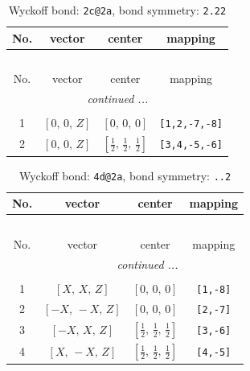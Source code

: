 \documentclass[fleqn,8pt]{jsarticle}
\begin{document}
\renewcommand{\arraystretch}{1.2}
\begin{longtable}{cccc}
\caption{Wyckoff bond: {\tt 2c@2a}, bond symmetry: {\tt 2.22}}
 \\
 \hline \hline
No. & vector & center & mapping \\ \hline \endfirsthead

\multicolumn{3}{l}{\tablename\ \thetable{}} \\
 \hline \hline
No. & vector & center & mapping \\ \hline \endhead

 \hline \hline
\multicolumn{3}{r}{\footnotesize\it continued ...} \\ \endfoot

 \hline \hline
\multicolumn{3}{r}{} \\ \endlastfoot

1 & $\left[ 0,\, 0,\, Z \right]$ & $\left[ 0,\, 0,\, 0 \right]$ & {\tt [1,2,-7,-8]} \\ \hline
2 & $\left[ 0,\, 0,\, Z \right]$ & $\left[ \frac{1}{2},\, \frac{1}{2},\, \frac{1}{2} \right]$ & {\tt [3,4,-5,-6]} \\
\end{longtable}
\renewcommand{\arraystretch}{1.2}
\begin{longtable}{cccc}
\caption{Wyckoff bond: {\tt 4d@2a}, bond symmetry: {\tt ..2}}
 \\
 \hline \hline
No. & vector & center & mapping \\ \hline \endfirsthead

\multicolumn{3}{l}{\tablename\ \thetable{}} \\
 \hline \hline
No. & vector & center & mapping \\ \hline \endhead

 \hline \hline
\multicolumn{3}{r}{\footnotesize\it continued ...} \\ \endfoot

 \hline \hline
\multicolumn{3}{r}{} \\ \endlastfoot

1 & $\left[ X,\, X,\, Z \right]$ & $\left[ 0,\, 0,\, 0 \right]$ & {\tt [1,-8]} \\ \hline
2 & $\left[ - X,\, - X,\, Z \right]$ & $\left[ 0,\, 0,\, 0 \right]$ & {\tt [2,-7]} \\ \hline
3 & $\left[ - X,\, X,\, Z \right]$ & $\left[ \frac{1}{2},\, \frac{1}{2},\, \frac{1}{2} \right]$ & {\tt [3,-6]} \\ \hline
4 & $\left[ X,\, - X,\, Z \right]$ & $\left[ \frac{1}{2},\, \frac{1}{2},\, \frac{1}{2} \right]$ & {\tt [4,-5]} \\
\end{longtable}
\end{document}
